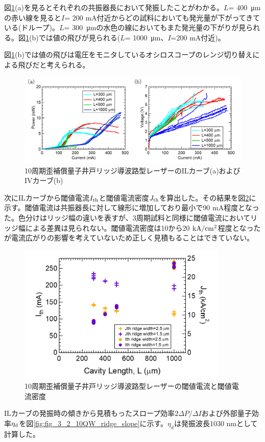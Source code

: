 {図\ref{fig:fig_3_2_10QW_ridge_IL}(a)を見るとそれぞれの共振器長において発振したことがわかる。$L$= 400\ \si{\micro\metre}の赤い線を見ると$I$= 200 mA付近からどの試料においても発光量が下がってきている(ドループ)。$L$= 300\ \si{\micro\metre}の水色の線においてもまた発光量の下がりが見られる。図\ref{fig:fig_3_2_10QW_ridge_IL}(b)では値の飛びが見られる($L$= 1000\ \si{\micro\metre}、$I$=200 mA付近)。

図\ref{fig:fig_3_2_10QW_ridge_IL}(b)では値の飛びは電圧をモニタしているオシロスコープのレンジ切り替えによる飛びだと考えられる。


\begin{figure}[h]
	\centering
	\includegraphics[width=15cm]{figure/fig_3_2_10QW_ridge_IL.png}
		\caption{10周期歪補償量子井戸リッジ導波路型レーザーのILカーブ(a)およびIVカーブ(b)}
		\label{fig:fig_3_2_10QW_ridge_IL}
\end{figure}
次にILカーブから閾値電流$I_{\rm{th}}$と閾値電流密度$J_{\rm{th}}$を算出した。その結果を図\ref{fig:fig_3_2_10QW_ridge_Ith}に示す。閾値電流は共振器長に対して線形に増加しており最小で90 mA程度となった。色分けはリッジ幅の違いを表すが、3周期試料と同様に閾値電流においてリッジ幅による差異は見られない。閾値電流密度は10から20 $\rm{kA/cm^{2}}$程度となったが電流広がりの影響を考えていないため正しく見積もることはできていない。
\begin{figure}[h]
	\centering
	\includegraphics[width=10cm]{figure/fig_3_2_10QW_ridge_Ith.png}
		\caption{10周期歪補償量子井戸リッジ導波路型レーザーの閾値電流と閾値電流密度}
		\label{fig:fig_3_2_10QW_ridge_Ith}
\end{figure}
ILカーブの発振時の傾きから見積もったスロープ効率$2\Delta P/\Delta I$および外部量子効率$\eta_{\rm{d}}$を図\ref{fig:fig_3_2_10QW_ridge_slope}に示す。$\eta_{d}$は発振波長1030 nmとして計算した。

}
